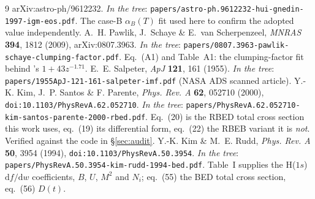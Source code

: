 \documentclass[11pt,a4paper]{article}
\begin{document}
\begin{thebibliography}{9}
  arXiv:astro-ph/9612232. \emph{In the tree}:
  \texttt{papers/astro-ph.9612232-hui-gnedin-1997-igm-eos.pdf}. The case-B
  $\alpha_B(T)$ fit used here to confirm the adopted value independently.
 A.~H. Pawlik, J.~Schaye \& E.~van Scherpenzeel,
  \emph{MNRAS} \textbf{394}, 1812 (2009), arXiv:0807.3963. \emph{In the tree}:
  \texttt{papers/0807.3963-pawlik-schaye-clumping-factor.pdf}. Eq.~(A1) and
  Table~A1: the clumping-factor fit behind \cite{md14}'s $1+43z^{-1.71}$.
 E.~E. Salpeter, \emph{ApJ} \textbf{121}, 161 (1955).
  \emph{In the tree}: \texttt{papers/1955ApJ-121-161-salpeter-imf.pdf} (NASA ADS
  scanned article).
 Y.-K. Kim, J.~P. Santos \& F. Parente, \emph{Phys. Rev. A} \textbf{62},
  052710 (2000), \texttt{doi:10.1103/PhysRevA.62.052710}.
  \emph{In the tree}: \texttt{papers/PhysRevA.62.052710-kim-santos-parente-2000-rbed.pdf}. Eq.~(20) is the RBED total
  cross section this work uses, eq.~(19) its differential form, eq.~(22) the RBEB
  variant it is \emph{not}. Verified against the code in \S\ref{sec:audit}.
 Y.-K. Kim \& M.~E. Rudd, \emph{Phys. Rev. A} \textbf{50}, 3954 (1994),
  \texttt{doi:10.1103/PhysRevA.50.3954}. \emph{In the tree}:
  \texttt{papers/PhysRevA.50.3954-kim-rudd-1994-bed.pdf}. Table~I supplies the H($1s$)
  $\mathrm{d}f/\mathrm{d}w$ coefficients, $B$, $U$, $M^2$ and $N_i$; eq.~(55) the
  BED total cross section, eq.~(56) $D(t)$.
\end{thebibliography}
\end{document}
